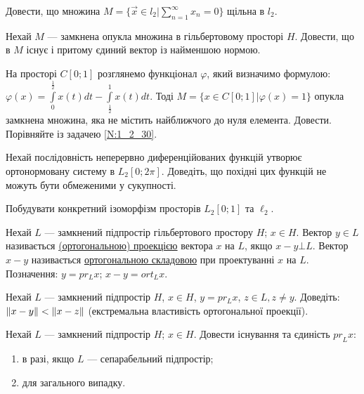 
\begin{exercise}
    Довести, що множина $M = \{ \vec{x} \in l_2 | \sum\limits_{n = 1}^{\infty}x_n = 0\}$
    щільна в $l_2$.
\end{exercise}

\begin{exercise}\label{N:1_2_30}
    Нехай $M$ --- замкнена опукла множина в гільбертовому просторі $H$. Довести, що в $M$
    існує і притому єдиний вектор із найменшою нормою.
\end{exercise}

\begin{exercise}
    На просторі $C[0;1]$ розглянемо функціонал $\varphi$, який визначимо формулою: 
    $\varphi(x) = \int\limits_{0}^{\frac{1}{2}}x(t)dt - \int\limits_{\frac{1}{2}}^{1}x(t)dt$. Тоді
    $M = \{x \in C[0; 1] | \varphi(x) = 1\}$ опукла замкнена множина, яка не містить найближчого до 
    нуля елемента. Довести. Порівняйте із задачею \ref{N:1_2_30}.
\end{exercise}

\begin{exercise}
    Нехай послідовність неперервно диференційованих функцій утворює ортонормовану систему
    в $L_2[0; 2\pi]$. Доведіть, що похідні цих функцій не можуть бути обмеженими у сукупності.
\end{exercise}

\begin{exercise}
    Побудувати конкретний ізоморфізм просторів $L_2[0;1]$ та $\ell_2$.
\end{exercise}

\begin{theory}
    Нехай $L$ --- замкнений підпростір гільбертового простору $H$; $x \in H$. Вектор
    $y \in L$ називається \uline{(ортогональною) проекцією} вектора $x$ на $L$, якщо
    $x - y \bot L$. Вектор $x - y$ називається \uline{ортогональною складовою} при
    проектуванні $x$ на $L$. Позначення: $y = pr_L x$; $x - y = ort_L x$.
\end{theory}

\begin{exercise}
    Нехай $L$ --- замкнений підпростір $H$, $x \in H$, $y = pr_L x$, $z \in L, z \neq y$.
    Доведіть: $\left\lVert x - y\right\rVert < \left\lVert x - z\right\rVert$ (екстремальна властивість ортогональної проекції).
\end{exercise}

\begin{exercise}
    Нехай $L$ --- замкнений підпростір $H$; $x \in H$. Довести існування та єдиність ${pr}_L x$:
    \begin{enumerate}[label=\ukr*)]
        \item в разі, якщо $L$ --- сепарабельний підпростір;
        \item для загального випадку.
    \end{enumerate}
\end{exercise}


